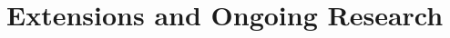 \documentclass[xcolor=dvipsnames,hyperref={pdfpagelabels=false},unknownkeysallowed]{beamer}
\newcommand{\colb}[1]{{\color{blue} #1}}
\newcommand{\colG}[1]{{\color{Gray!110} #1}}
\newlength{\wideitemsep}
\let\olditem\item
\renewcommand{\item}{\setlength{\itemsep}{\wideitemsep}\olditem}
\newcommand{\B}[1]{\ensuremath{\mathbf{#1}}}
\begin{document}
\begin{frame}
\end{frame}

\section{Extensions and Ongoing Research}

%
%
\end{document}
